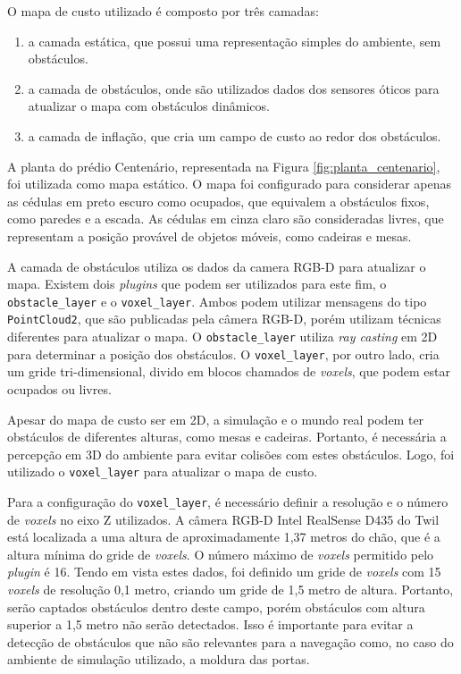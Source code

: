 \documentclass[repeatfields,xlists,xpacks,oneside,yearsonly]{ufrgscca}
\begin{document}
O mapa de custo utilizado é composto por três camadas:
\begin{enumerate}
    \item a camada estática, que possui uma representação simples do ambiente,
          sem obstáculos.
    \item a camada de obstáculos, onde são utilizados dados dos sensores óticos
          para atualizar o mapa com obstáculos dinâmicos.
    \item a camada de inflação, que cria um campo de custo ao redor dos obstáculos.
\end{enumerate}

A planta do prédio Centenário, representada na Figura \ref{fig:planta_centenario},
foi utilizada como mapa estático. O mapa foi configurado para considerar apenas as
cédulas em preto escuro como ocupados, que equivalem a obstáculos fixos, como paredes
e a escada. As cédulas em cinza claro são consideradas livres, que representam a posição
provável de objetos móveis, como cadeiras e mesas.

A camada de obstáculos utiliza os dados da camera RGB-D para atualizar o mapa.
Existem dois \textit{plugins} que podem ser utilizados para este fim, o
\texttt{obstacle\_layer} e o \texttt{voxel\_layer}.
Ambos podem utilizar mensagens do tipo \texttt{PointCloud2}, que são publicadas
pela câmera RGB-D, porém utilizam técnicas diferentes para atualizar o mapa.
O \texttt{obstacle\_layer} utiliza \textit{ray casting} em 2D para
determinar a posição dos obstáculos.
O \texttt{voxel\_layer}, por outro lado, cria um gride tri-dimensional,
divido em blocos chamados de \textit{voxels}, que podem estar ocupados ou livres.

Apesar do mapa de custo ser em 2D, a simulação e o mundo real podem ter obstáculos
de diferentes alturas, como mesas e cadeiras. Portanto, é necessária a percepção em
3D do ambiente para evitar colisões com estes obstáculos. Logo, foi utilizado o
\texttt{voxel\_layer} para atualizar o mapa de custo.

Para a configuração do \texttt{voxel\_layer}, é necessário definir a resolução
e o número de \textit{voxels} no eixo Z utilizados.
A câmera RGB-D Intel RealSense D435 do Twil está localizada a uma altura de aproximadamente
1,37 metros do chão, que é a altura mínima do gride de \textit{voxels}.
O número máximo de \textit{voxels} permitido pelo \textit{plugin} é 16.
Tendo em vista estes dados, foi definido um gride de \textit{voxels} com 15 \textit{voxels}
de resolução 0,1 metro, criando um gride de 1,5 metro de altura.
Portanto, serão captados obstáculos dentro deste campo, porém obstáculos com altura
superior a 1,5 metro não serão detectados.
Isso é importante para evitar a detecção de obstáculos que não são relevantes para
a navegação como, no caso do ambiente de simulação utilizado, a moldura das portas.
\end{document}
